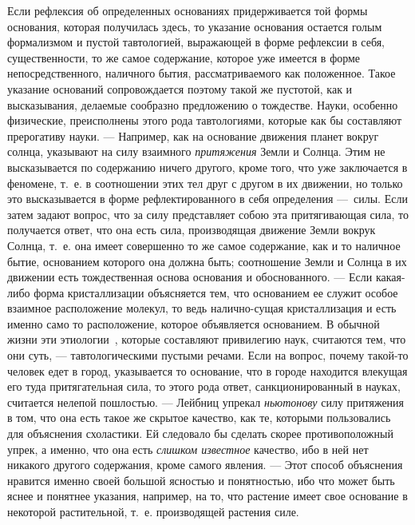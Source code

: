 Если рефлексия об определенных основаниях придерживается той формы
основания, которая получилась здесь, то указание основания остается голым
формализмом и пустой тавтологией, выражающей в форме рефлексии в себя,
существенности, то же самое содержание, которое уже имеется в форме
непосредственного, наличного бытия, рассматриваемого как положенное. Такое
указание оснований сопровождается поэтому такой же пустотой, как и
высказывания, делаемые сообразно предложению о тождестве. Науки, особенно
физические, преисполнены этого рода тавтологиями, которые как бы составляют
прерогативу науки. — Например, как на основание движения планет вокруг
солнца, указывают на силу взаимного {\em притяжения}
Земли и Солнца. Этим не высказывается по содержанию ничего другого, кроме
того, что уже заключается в феномене, т.~е. в соотношении этих тел друг с
другом в их движении, но только это высказывается в форме рефлектированного
в себя определения —~силы. Если затем задают вопрос, что за силу
представляет собою эта притягивающая сила, то получается ответ, что она
есть сила, производящая движение Земли вокрук Солнца, т.~е. она имеет
совершенно то же самое содержание, как и то наличное бытие, основанием
которого она должна быть; соотношение Земли и Солнца в их движении есть
тождественная основа основания и обоснованного. — Если какая-либо форма
кристаллизации объясняется тем, что основанием ее служит особое взаимное
расположение молекул, то ведь налично-сущая кристаллизация и есть именно
само то расположение, которое объявляется основанием. В обычной жизни эти
этиологии~,
которые составляют привилегию наук, считаются тем, что они суть, —
тавтологическими пустыми речами. Если на вопрос, почему такой-то человек
едет в город, указывается то основание, что в городе находится влекущая его
туда притягательная сила, то этого рода ответ, санкционированный в науках,
считается нелепой пошлостью. — Лейбниц упрекал
{\em ньютонову} силу притяжения в том, что она есть
такое же скрытое качество, как те, которыми пользовались для объяснения
схоластики. Ей следовало бы сделать скорее противоположный упрек, а именно,
что она есть {\em слишком известное} качество, ибо в
ней нет никакого другого содержания, кроме самого явления. — Этот способ
объяснения нравится именно своей большой ясностью и понятностью, ибо что
может быть яснее и понятнее указания, например, на то, что растение имеет
свое основание в некоторой растительной, т.~е. производящей растения силе.

